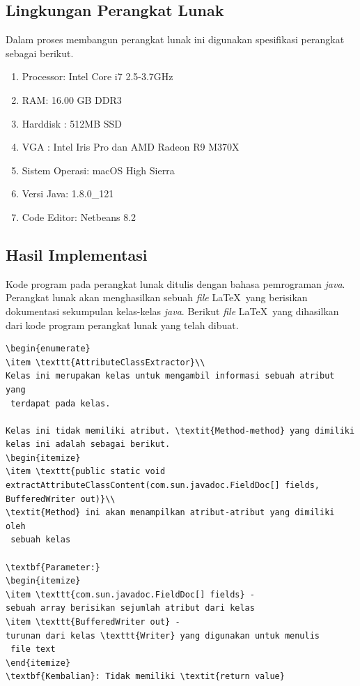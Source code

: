 \documentclass[a4paper,twoside]{article}
\begin{document}
\begin{enumerate}
\subsection{Lingkungan Perangkat Lunak}
\label{sec:lingkungan perangkat lunak}
Dalam proses membangun perangkat lunak ini digunakan spesifikasi perangkat sebagai berikut.

\begin{enumerate}
	\item Processor: Intel Core i7 2.5-3.7GHz 
	\item RAM: 16.00 GB DDR3	
	\item Harddisk : 512MB SSD
	\item VGA : Intel Iris Pro dan AMD Radeon R9 M370X
	\item Sistem Operasi: macOS High Sierra
	\item Versi Java: 1.8.0\_121
	\item Code Editor: Netbeans 8.2
\end{enumerate}

\subsection{Hasil Implementasi}
\label{sec:hasil implementasi}
Kode program pada perangkat lunak ditulis dengan bahasa pemrograman {\it java}. Perangkat lunak akan menghasilkan sebuah {\it file} \LaTeX\ yang berisikan dokumentasi sekumpulan kelas-kelas {\it java}. Berikut {\it file} \LaTeX\ yang dihasilkan dari kode program perangkat lunak yang telah dibuat.
\begin{lstlisting}[caption=Hasil Implementasi]
\begin{enumerate}
\item \texttt{AttributeClassExtractor}\\ 
Kelas ini merupakan kelas untuk mengambil informasi sebuah atribut yang
 terdapat pada kelas.

Kelas ini tidak memiliki atribut. \textit{Method-method} yang dimiliki kelas ini adalah sebagai berikut.
\begin{itemize}
\item \texttt{public static void extractAttributeClassContent(com.sun.javadoc.FieldDoc[] fields, BufferedWriter out)}\\ 
\textit{Method} ini akan menampilkan atribut-atribut yang dimiliki oleh
 sebuah kelas

\textbf{Parameter:}
\begin{itemize}
\item \texttt{com.sun.javadoc.FieldDoc[] fields} - 
sebuah array berisikan sejumlah atribut dari kelas
\item \texttt{BufferedWriter out} - 
turunan dari kelas \texttt{Writer} yang digunakan untuk menulis
 file text
\end{itemize}
\textbf{Kembalian}: Tidak memiliki \textit{return value}


\end{lstlisting}
\end{enumerate}
\end{document}
